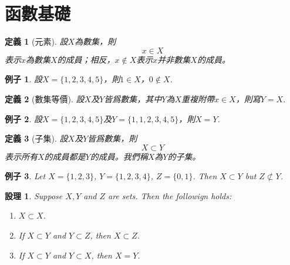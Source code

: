 \documentclass[12pt]{article}
\newtheorem{definition}{定義}
\newtheorem*{proposition}{設理}
\newtheorem*{example}{例子}
\begin{document}
    \section*{函數基礎}

    \begin{definition}[元素]
        設$X$為數集，則$$x\in X$$表示$x$為數集$X$的成員；相反，$x\notin X$表示$x$并非數集$X$的成員。 
    \end{definition}

    \begin{example}
        設$X=\{1,2,3,4,5\}$，則$1\in X$，$0\notin X$.
    \end{example}

    \begin{definition}[數集等價]
        設$X$及$Y$皆爲數集，其中$Y$為$X$重複附帶$x\in X$，則寫$Y=X$.
    \end{definition}

    \begin{example}
        設$X=\{1,2,3,4,5\}$及$Y=\{1,1,2,3,4,5\}$，則$X=Y$.
    \end{example}

    \begin{definition}[子集]
        設$X$及$Y$皆爲數集，則$$X\subset Y$$ 表示所有$X$的成員都是$Y$的成員。我們稱$X$為$Y$的子集。
    \end{definition}

    \begin{example}
        Let $X=\{1,2,3\}$, $Y=\{1,2,3,4\}$, $Z=\{0,1\}$. Then $X\subset Y$ but $Z\not \subset Y$.
    \end{example}

    \begin{proposition}
        Suppose $X,Y$ and $Z$ are sets. Then the followign holds:\begin{enumerate}
            \item $X\subset X$.
            \item If $X\subset Y$ and $Y\subset Z$, then $X\subset Z$.
            \item If $X\subset Y$ and $Y\subset X$, then $X=Y$.
        \end{enumerate}
    \end{proposition}
\end{document}
